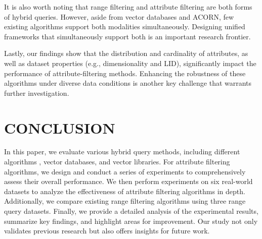 \documentclass[sigconf, nonacm]{acmart}
\begin{document}
\begin{sloppypar}
It is also worth noting that range filtering and attribute filtering are both forms of hybrid queries. However, aside from vector databases and ACORN, few existing algorithms support both modalities simultaneously. Designing unified frameworks that simultaneously support both is an important research frontier. 

Lastly, our findings show that the distribution and cardinality of attributes, as well as dataset properties (e.g., dimensionality and LID), significantly impact the performance of attribute-filtering methods. Enhancing the robustness of these algorithms under diverse data conditions is another key challenge that warrants further investigation.


\section{CONCLUSION}

In this paper, we evaluate various hybrid query methods, including different algorithms , vector databases, and vector libraries. For attribute filtering algorithms, we design and conduct a series of experiments to comprehensively assess their overall performance. We then perform experiments on six real-world datasets to analyze the effectiveness of attribute filtering algorithms in depth. Additionally, we compare existing range filtering algorithms using three range query datasets. Finally, we provide a detailed analysis of the experimental results, summarize key findings, and highlight areas for improvement. Our study not only validates previous research but also offers insights for future work.



\clearpage



\end{sloppypar}
\end{document}
